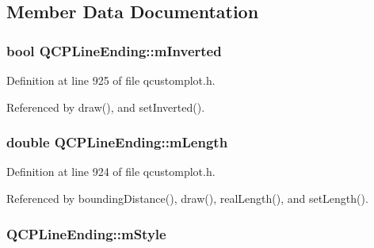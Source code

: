 \subsection{Member Data Documentation}
\hypertarget{class_q_c_p_line_ending_a91306fe771d54c955e0af21af14349d5}{}
\subsubsection[{m\+Inverted}]{\setlength{\rightskip}{0pt plus 5cm}bool Q\+C\+P\+Line\+Ending\+::m\+Inverted\hspace{0.3cm}{\ttfamily [protected]}}\label{class_q_c_p_line_ending_a91306fe771d54c955e0af21af14349d5}


Definition at line 925 of file qcustomplot.\+h.



Referenced by draw(), and set\+Inverted().

\hypertarget{class_q_c_p_line_ending_ae8e1e2566b96c05736cd92662dba8af8}{}
\subsubsection[{m\+Length}]{\setlength{\rightskip}{0pt plus 5cm}double Q\+C\+P\+Line\+Ending\+::m\+Length\hspace{0.3cm}{\ttfamily [protected]}}\label{class_q_c_p_line_ending_ae8e1e2566b96c05736cd92662dba8af8}


Definition at line 924 of file qcustomplot.\+h.



Referenced by bounding\+Distance(), draw(), real\+Length(), and set\+Length().

\hypertarget{class_q_c_p_line_ending_a4696fc9117b60f1ca7690fcd2ba56611}{}
\subsubsection[{m\+Style}]{ Q\+C\+P\+Line\+Ending\+::m\+Style\hspace{0.3cm}{\ttfamily [protected]}}\label{class_q_c_p_line_ending_a4696fc9117b60f1ca7690fcd2ba56611}


